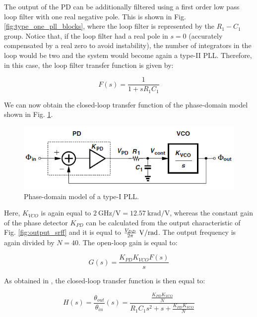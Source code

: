 \documentclass[lettersize,journal]{IEEEtran}
\begin{document}
The output of the PD can be additionally filtered using a first order low pass loop filter with one real negative pole. This is shown in Fig. \ref{fig:type_one_pll_blocks}, where the loop filter is represented by the $R_1-C_1$ group. Notice that, if the loop filter had a real pole in $s=0$ (accurately compensated by a real zero to avoid instability), the number of integrators in the loop would be two and the system would become again a type-II PLL. Therefore, in this case, the loop filter transfer function is given by:

\begin{equation}\label{eq:loop_filter_tf_type_one}
    F(s)=\frac{1}{1+sR_1C_1}
\end{equation}

We can now obtain the closed-loop transfer function of the phase-domain model shown in Fig. \ref{fig:phase_dom_model_type_one}.

\begin{figure}
    \centering
    \includegraphics[width=1\linewidth]{images/type_one_pll/phase_domain_model.png}
    \caption{Phase-domain model of a type-I PLL.}
    \label{fig:phase_dom_model_type_one}
\end{figure}

Here, $K_{VCO}$ is again equal to $\qty[per-mode = symbol]{2}{\giga\hertz\per\volt}=\qty[per-mode=symbol]{12.57}{\kilo\radian\per\volt}$, whereas the constant gain of the phase detector $K_{PD}$ can be calculated from the output characteristic of Fig. \ref{fig:output_srff} and it is equal to $\frac{V_{DD}}{2\pi}\ \unit[per-mode=symbol]{\volt\per\radian}$. The output frequency is again divided by $N=40$.
The open-loop gain is equal to:

\begin{equation}\label{eq:open_loop_gain}
    G(s)=\frac{K_{PD}K_{VCO}F(s)}{s}
\end{equation}

As obtained in \cite{razavitypeone}, the closed-loop transfer function is then equal to:

\begin{equation}\label{eq:type_one_tf}
    H(s)=\frac{\theta_{out}}{\theta_{in}}(s)=\frac{\frac{K_{PD}K_{VCO}}{N}}{R_1C_1s^2+s+\frac{K_{PD}K_{VCO}}{N}}
\end{equation}
\end{document}
